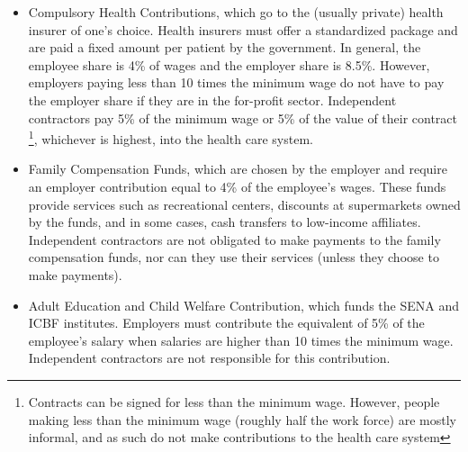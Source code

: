 \documentclass[12pt]{article}
\begin{document}
\begin{appendices}
\begin{itemize}
\item Compulsory Health Contributions,
  which go to the (usually private) health insurer of one's choice.
  Health insurers must offer a standardized package
  and are paid a fixed amount per patient by the government.
  In general, the employee share is 4\% of wages
  and the employer share is 8.5\%.
  However, employers paying less than 10 times the minimum wage
  do not have to pay the employer share if they are in the for-profit sector.
  Independent contractors pay 5\% of the minimum wage
  or 5\% of the value of their contract
  \footnote{
  Contracts can be signed for less than the minimum wage.
  However, people making less than the minimum wage
  (roughly half the work force) are mostly informal,
  and as such do not make contributions to the health care system},
  whichever is highest, into the health care system.

\item Family Compensation Funds,
  which are chosen by the employer
  and require an employer contribution equal to 4\% of the employee's wages.
  These funds provide services such as recreational centers,
  discounts at supermarkets owned by the funds,
  and in some cases, cash transfers to low-income affiliates.
  Independent contractors are not obligated
  to make payments to the family compensation funds,
  nor can they use their services
  (unless they choose to make payments).

\item Adult Education and Child Welfare Contribution,
  which funds the SENA and ICBF institutes.
  Employers must contribute the equivalent of
  5\% of the employee's salary
  when salaries are higher than 10 times the minimum wage.
  Independent contractors are not responsible for this contribution.

\end{itemize}


\end{appendices}
\end{document}
